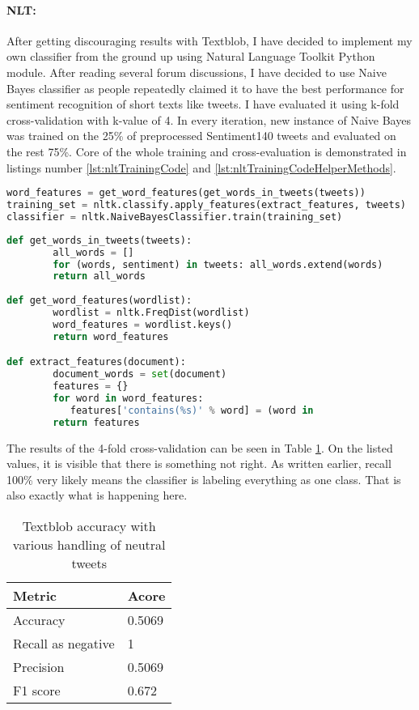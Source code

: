 \paragraph{NLT:} After getting discouraging results with Textblob, I have decided to implement my own classifier from the ground up using Natural Language Toolkit Python module. After reading several forum discussions, I have decided to use Naive Bayes classifier as people repeatedly claimed it to have the best performance for sentiment recognition of short texts like tweets. I have evaluated it using k-fold cross-validation with k-value of 4. In every iteration, new instance of Naive Bayes was trained on the 25\% of preprocessed Sentiment140 tweets and evaluated on the rest 75\%. Core of the whole training and cross-evaluation is demonstrated in listings number \ref{lst:nltTrainingCode} and \ref{lst:nltTrainingCodeHelperMethods}.

\begin{lstlisting}[caption={Feature extraction and NLT classifier training},label={lst:nltTrainingCode},language=Python]
word_features = get_word_features(get_words_in_tweets(tweets))
training_set = nltk.classify.apply_features(extract_features, tweets)
classifier = nltk.NaiveBayesClassifier.train(training_set)
\end{lstlisting}    
\begin{lstlisting}[caption={Helper methods for text features extraction},label={lst:nltTrainingCodeHelperMethods},language=Python]
def get_words_in_tweets(tweets):
    	all_words = []
    	for (words, sentiment) in tweets: all_words.extend(words)
    	return all_words    
    
def get_word_features(wordlist):
    	wordlist = nltk.FreqDist(wordlist)
    	word_features = wordlist.keys()
    	return word_features

def extract_features(document):
    	document_words = set(document)
    	features = {}
    	for word in word_features:
           features['contains(%s)' % word] = (word in                                           		   document_words)
    	return features
\end{lstlisting}

The results of the 4-fold cross-validation can be seen in Table \ref{table:NLTmetrics}. On the listed values, it is visible that there is something not right. As written earlier, recall 100\% very likely means the classifier is labeling everything as one class. That is also exactly what is happening here.

\begin{table}[H]
\centering
\begin{tabular}{ |p{3cm}|p{3cm}|}
 \hline
\textbf{ Metric }& \textbf{Acore}\\
 \hline
 Accuracy   & 0.5069\\ \hline
 Recall as negative & 1\\ \hline
 Precision & 0.5069\\ \hline 
 F1 score & 0.672\\ \hline 
\end{tabular}
\caption{Textblob accuracy with various handling of neutral tweets}
\label{table:NLTmetrics}
\end{table}

